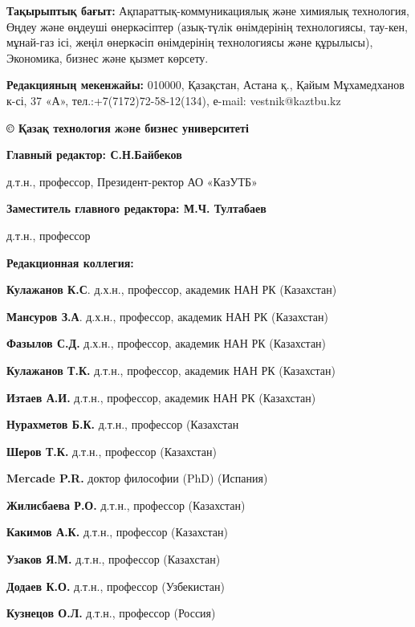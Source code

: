 {\bfseries Тақырыптық бағыт:} Ақпараттық-коммуникациялық және химиялық
технология, Өңдеу және өңдеуші өнеркәсіптер (азық-түлік өнімдерінің
технологиясы, тау-кен, мұнай-газ ісі, жеңіл өнеркәсіп өнімдерінің
технологиясы және құрылысы), Экономика, бизнес және қызмет көрсету.

{\bfseries Редакцияның мекенжайы:} 010000, Қазақстан, Астана қ., Қайым
Мұхамедханов к-сі, 37 «А», тел.:+7(7172)72-58-12(134), е-mail:
vestnik@kaztbu.kz

\begin{center}
{\bfseries \large © Қазақ технология жəне бизнес университеті}
\end{center}

\pagebreak

\begin{center}
{\bfseries Главный редактор: С.Н.Байбеков}

д.т.н., профессор, Президент-ректор АО «КазУТБ»

{\bfseries Заместитель главного редактора: М.Ч. Тултабаев}

д.т.н., профессор

{\bfseries Редакционная коллегия:}
\end{center}

{\bfseries Кулажанов К.С}. д.х.н., профессор, академик НАН РК (Казахстан)

{\bfseries Мансуров З.А}. д.х.н., профессор, академик НАН РК (Казахстан)

{\bfseries Фазылов С.Д.} д.х.н., профессор, академик НАН РК (Казахстан)

{\bfseries Кулажанов Т.К.} д.т.н., профессор, академик НАН РК (Казахстан)

{\bfseries Изтаев А.И.} д.т.н., профессор, академик НАН РК (Казахстан)

{\bfseries Нурахметов Б.К.} д.т.н., профессор (Казахстан

{\bfseries Шеров Т.К.} д.т.н., профессор (Казахстан)

{\bfseries Mercade P.R.} доктор философии (PhD) (Испания)

{\bfseries Жилисбаева Р.О.} д.т.н., профессор (Казахстан)

{\bfseries Какимов А.К.} д.т.н., профессор (Казахстан)

{\bfseries Узаков Я.М.} д.т.н., профессор (Казахстан)

{\bfseries Додаев К.О.} д.т.н., профессор (Узбекистан)

{\bfseries Кузнецов О.Л.} д.т.н., профессор (Россия)

